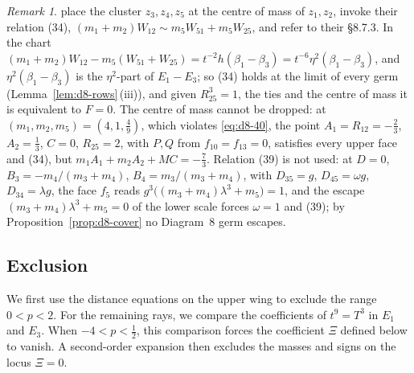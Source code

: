 \documentclass[11pt]{amsart}
\theoremstyle{definition}
\theoremstyle{remark}
\newtheorem{remark}[theorem]{Remark}
\begin{document}
\begin{remark}\label{rem:d8-ak}
\cite[\S8.8]{AK} place the cluster $z_3,z_4,z_5$ at the centre of mass of $z_1,z_2$, invoke
their relation (34), $(m_1+m_2)W_{12}\sim m_5W_{51}+m_5W_{25}$, and refer to their \S8.7.3.  In
the chart $(m_1+m_2)W_{12}-m_5(W_{51}+W_{25})=t^{-2}h(\beta_1-\beta_3)=t^{-6}\eta^2
(\beta_1-\beta_3)$, and $\eta^2(\beta_1-\beta_3)$ is the $\eta^2$-part of $E_1-E_3$; so (34)
holds at the limit of every germ (Lemma~\ref{lem:d8-rows}\,(iii)), and given $R_{25}^3=1$, the
ties and the centre of mass it is equivalent to $F=0$.  The centre of mass cannot be dropped: at
$(m_1,m_2,m_5)=(4,1,\frac49)$, which violates \eqref{eq:d8-40}, the point
$A_1=R_{12}=-\frac23$, $A_2=\frac13$, $C=0$, $R_{25}=2$, with $P,Q$ from $f_{10}=f_{13}=0$,
satisfies every upper face and (34), but $m_1A_1+m_2A_2+MC=-\frac73$.  Relation (39) is not
used: at $D=0$, $B_3=-m_4/(m_3+m_4)$, $B_4=m_3/(m_3+m_4)$, with $D_{35}=g$, $D_{45}=\omega g$,
$D_{34}=\lambda g$, the face $f_5$ reads $g^3\bigl((m_3+m_4)\lambda^3+m_5\bigr)=1$, and the
escape $(m_3+m_4)\lambda^3+m_5=0$ of the lower scale forces $\omega=1$ and (39); by
Proposition~\ref{prop:d8-cover} no Diagram~8 germ escapes.
\end{remark}

\subsection{Exclusion}
{We first use the distance equations on the upper wing to exclude the range
$0<p<2$.  For the remaining rays, we compare the}
coefficients of $t^9=T^3$ in $E_1$ and $E_3$.  When $-4<p<\frac12$, this
comparison forces the coefficient $\Xi$ defined below to vanish.  A second-order
expansion then excludes the masses and signs on the locus $\Xi=0$.
\end{document}
